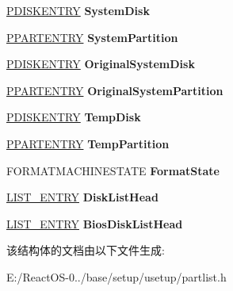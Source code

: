 \begin{DoxyCompactItemize}
\hyperlink{struct___d_i_s_k_e_n_t_r_y}{P\+D\+I\+S\+K\+E\+N\+T\+RY} {\bfseries System\+Disk}
\item 
\mbox{\label{struct___p_a_r_t_l_i_s_t_a1ff6fad4e3675c3cb4e110e3da54a385}} 
\hyperlink{struct___p_a_r_t_e_n_t_r_y}{P\+P\+A\+R\+T\+E\+N\+T\+RY} {\bfseries System\+Partition}
\item 
\mbox{\label{struct___p_a_r_t_l_i_s_t_a816e1af914363f38929ddb76469a8f66}} 
\hyperlink{struct___d_i_s_k_e_n_t_r_y}{P\+D\+I\+S\+K\+E\+N\+T\+RY} {\bfseries Original\+System\+Disk}
\item 
\mbox{\label{struct___p_a_r_t_l_i_s_t_a29ee207c254e9f97dc137fc29d3b98b7}} 
\hyperlink{struct___p_a_r_t_e_n_t_r_y}{P\+P\+A\+R\+T\+E\+N\+T\+RY} {\bfseries Original\+System\+Partition}
\item 
\mbox{\label{struct___p_a_r_t_l_i_s_t_ad1e70547f959ef8f4052c50a39f7474d}} 
\hyperlink{struct___d_i_s_k_e_n_t_r_y}{P\+D\+I\+S\+K\+E\+N\+T\+RY} {\bfseries Temp\+Disk}
\item 
\mbox{\label{struct___p_a_r_t_l_i_s_t_aec27a1125da8c8b09a9eab2bfd1ed015}} 
\hyperlink{struct___p_a_r_t_e_n_t_r_y}{P\+P\+A\+R\+T\+E\+N\+T\+RY} {\bfseries Temp\+Partition}
\item 
\mbox{\label{struct___p_a_r_t_l_i_s_t_af20907335df6285bb1ce9581617b67c4}} 
F\+O\+R\+M\+A\+T\+M\+A\+C\+H\+I\+N\+E\+S\+T\+A\+TE {\bfseries Format\+State}
\item 
\mbox{\label{struct___p_a_r_t_l_i_s_t_a2bad4102b13504fd96c5c541edc7d427}} 
\hyperlink{struct___l_i_s_t___e_n_t_r_y}{L\+I\+S\+T\+\_\+\+E\+N\+T\+RY} {\bfseries Disk\+List\+Head}
\item 
\mbox{\label{struct___p_a_r_t_l_i_s_t_af1222d45c114a87ccc1101866d5719eb}} 
\hyperlink{struct___l_i_s_t___e_n_t_r_y}{L\+I\+S\+T\+\_\+\+E\+N\+T\+RY} {\bfseries Bios\+Disk\+List\+Head}
\end{DoxyCompactItemize}


该结构体的文档由以下文件生成\+:\begin{DoxyCompactItemize}
\item 
E\+:/\+React\+O\+S-\/0../base/setup/usetup/partlist.\+h\end{DoxyCompactItemize}

